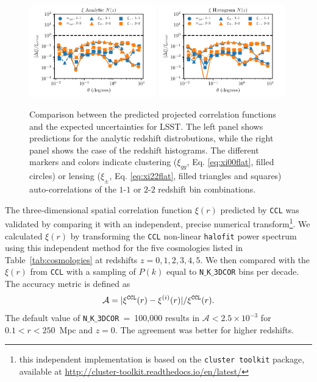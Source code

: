 \documentclass[\docopts]{\docclass}
\newcommand{\ccl}{{\tt CCL}\xspace}
\newcommand{\halofit}{{\tt halofit}\xspace}
\begin{document}
\begin{figure}
\centering
\includegraphics[width=0.49\textwidth]{projected_correlation_error_comparison_analytic} 
\includegraphics[width=0.49\textwidth]{projected_correlation_error_comparison_histo} 
\caption{Comparison between the predicted projected correlation functions and the expected uncertainties for LSST. The left panel shows predictions for the analytic redshift distrobutions, while the right panel shows the case of the redshift histograms. The different markers and colors indicate clustering ($\xi_{gg}$, Eq. \ref{eq:xi00flat}, filled circles) or lensing ($\xi_{\pm}$, Eq. \ref{eq:xi22flat}, filled triangles and squares) auto-correlations of the $1$-$1$ or $2$-$2$ redshift bin combinations.}
\label{fig:corrval}
\end{figure}

The three-dimensional spatial correlation function $\xi(r)$ predicted by \ccl was validated by comparing it with an independent, precise numerical transform\footnote{this independent implementation is based on the {\tt cluster toolkit} package, available at \url{http://cluster-toolkit.readthedocs.io/en/latest/}}. We calculated $\xi(r)$  by transforming the \ccl non-linear \halofit power spectrum using this independent method for the five cosmologies listed in Table~\ref{tab:cosmologies} at redshifts $z = 0,1,2,3,4,5$.  We then compared with the $\xi(r)$ from \ccl with a sampling of $P(k)$ equal to {\tt N$\_$K$\_$3DCOR} bins per decade. The accuracy metric is defined as
\begin{equation}
  \mathcal{A}=|\xi^{\tt CCL}(r)-\xi^{(i)}(r)| / \xi^{\tt CCL}(r).
  \label{eq:accxi}
\end{equation}
The default value of {\tt N$\_$K$\_$3DCOR}~=~100,000 results in $\mathcal{A} < 2.5 \times 10^{-3}$ for $0.1 < r < 250$~Mpc and $z=0$. The agreement was better for higher redshifts.
\end{document}
